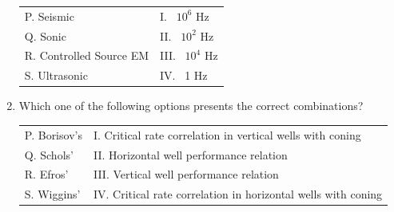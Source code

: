 \documentclass[journal,12pt,onecolumn]{IEEEtran}
\theoremstyle{remark}
\begin{document}
\begin{enumerate}
\hfill{}

\begin{tabular}{ll}
P. Seismic               & I. ~$10^6$ Hz \\
Q. Sonic                 & II. ~$10^2$ Hz \\
R. Controlled Source EM & III. ~$10^4$ Hz \\
S. Ultrasonic            & IV. ~1 Hz \\
\end{tabular}

\begin{enumerate} 
\end{enumerate}

\item Which one of the following options presents the correct combinations? 

\hfill{}

\begin{tabular}{ll}
P. Borisov's  & I. Critical rate correlation in vertical wells with coning \\
Q. Schols'    & II. Horizontal well performance relation \\
R. Efros'     & III. Vertical well performance relation \\
S. Wiggins'   & IV. Critical rate correlation in horizontal wells with coning 
\end{tabular}

\begin{enumerate} 
\end{enumerate}


\end{enumerate}
\end{document}
